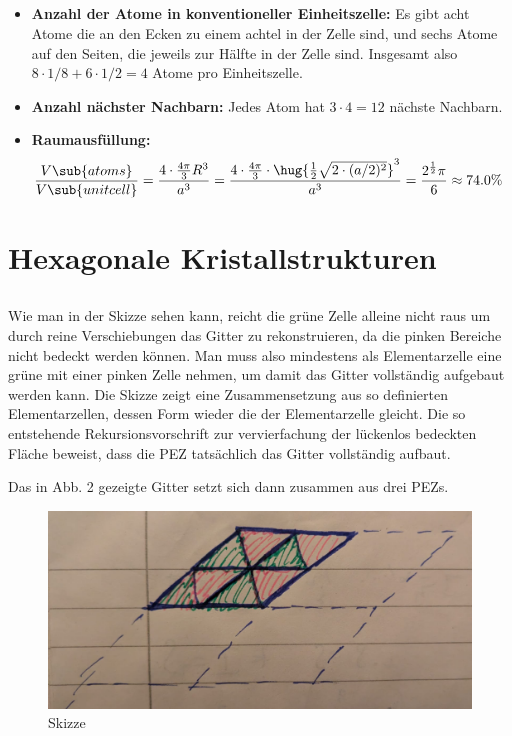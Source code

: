 \documentclass[exa]{exercise_5.0}
\begin{document}
\subsection{}
\begin{itemize}
    \item {\bf Anzahl der Atome in konventioneller Einheitszelle:} Es gibt acht Atome die an den Ecken zu einem achtel in der Zelle sind, und sechs Atome auf den Seiten, die jeweils zur Hälfte in der Zelle sind. Insgesamt also $8\cdot 1/8 + 6\cdot1/2 = 4$ Atome pro Einheitszelle.
    \item {\bf Anzahl nächster Nachbarn:} Jedes Atom hat $3\cdot 4=12$ nächste Nachbarn.
    \item {\bf Raumausfüllung:}
    \begin{align*}
        \frac{V\sub{atoms}}{V\sub{unit cell}}
        &= \frac{4\cdot \frac{4\pi}{3}R^3}{a^3}
        = \frac{4\cdot \frac{4\pi}{3}\cdot \hug{\frac12\sqrt{2\cdot (a/2)^2}}^3}{a^3}
        = \frac{2^\frac12\pi}{6}\approx 74.0\% 
    \end{align*}
\end{itemize}

\section{Hexagonale Kristallstrukturen}
\subsection{}
Wie man in der Skizze sehen kann, reicht die grüne Zelle alleine nicht raus um durch reine Verschiebungen das Gitter zu rekonstruieren, da die pinken Bereiche nicht bedeckt werden können. Man muss also mindestens als Elementarzelle eine grüne mit einer pinken Zelle nehmen, um damit das Gitter vollständig aufgebaut werden kann. Die Skizze zeigt eine Zusammensetzung aus so definierten Elementarzellen, dessen Form wieder die der Elementarzelle gleicht. Die so entstehende Rekursionsvorschrift zur vervierfachung der lückenlos bedeckten Fläche beweist, dass die PEZ tatsächlich das Gitter vollständig aufbaut.   

Das in Abb. 2 gezeigte Gitter setzt sich dann zusammen aus drei PEZs.
\begin{figure}[H]
    \centering
    \includegraphics[width=.6\textwidth]{gitter.jpg}
    \caption{Skizze}
\end{figure}
\end{document}
